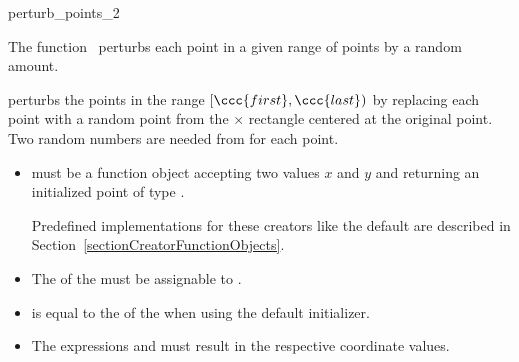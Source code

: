 \begin{ccRefFunction}{perturb_points_2}

\ccDefinition

The function \ccRefName\ perturbs each point in a given range of points by
a random amount. 



{ perturbs the points in the range $[\ccc{first},\ccc{last})$ by
  replacing each point with a random point from the 
   $\times$  rectangle centered at the original point.
  Two random numbers are needed from  for each point.
}

\ccRequirements
\begin{itemize}
   \item {} must be a function object accepting two
          values $x$ and $y$ and returning an initialized point
          of type . 

         Predefined implementations for these creators like the default are
         described in Section~\ref{sectionCreatorFunctionObjects}. 

  \item The  of the  must be assignable 
        to .
  \item {} is equal to the  of the
         when using the default initializer.
  \item The expressions  and
         must result in the respective
        coordinate values.
\end{itemize}

\ccSeeAlso
{} \\
 \\
 \\
 \\
 \\




\end{ccRefFunction}
